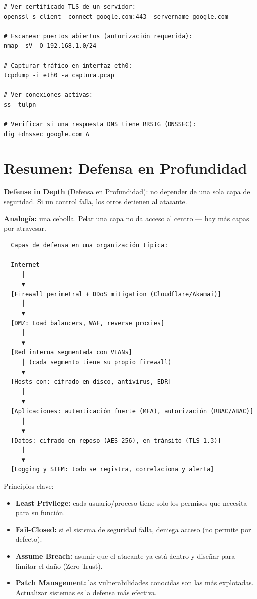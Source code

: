 \begin{codigo}
\begin{lstlisting}
# Ver certificado TLS de un servidor:
openssl s_client -connect google.com:443 -servername google.com

# Escanear puertos abiertos (autorización requerida):
nmap -sV -O 192.168.1.0/24

# Capturar tráfico en interfaz eth0:
tcpdump -i eth0 -w captura.pcap

# Ver conexiones activas:
ss -tulpn

# Verificar si una respuesta DNS tiene RRSIG (DNSSEC):
dig +dnssec google.com A
\end{lstlisting}
\end{codigo}

\section{ Resumen: Defensa en Profundidad}

\begin{concepto}
\textbf{Defense in Depth} (Defensa en Profundidad): no depender de una sola
capa de seguridad. Si un control falla, los otros detienen al atacante.

 \textbf{Analogía:} una cebolla. Pelar una capa no da
acceso al centro --- hay más capas por atravesar.
\end{concepto}

\begin{lstlisting}
  Capas de defensa en una organización típica:

  Internet
     │
     ▼
  [Firewall perimetral + DDoS mitigation (Cloudflare/Akamai)]
     │
     ▼
  [DMZ: Load balancers, WAF, reverse proxies]
     │
     ▼
  [Red interna segmentada con VLANs]
     │ (cada segmento tiene su propio firewall)
     ▼
  [Hosts con: cifrado en disco, antivirus, EDR]
     │
     ▼
  [Aplicaciones: autenticación fuerte (MFA), autorización (RBAC/ABAC)]
     │
     ▼
  [Datos: cifrado en reposo (AES-256), en tránsito (TLS 1.3)]
     │
     ▼
  [Logging y SIEM: todo se registra, correlaciona y alerta]
\end{lstlisting}

Principios clave:
\begin{itemize}
    \item \textbf{Least Privilege:} cada usuario/proceso tiene solo los permisos
          que necesita para su función.
    \item \textbf{Fail-Closed:} si el sistema de seguridad falla, deniega acceso
          (no permite por defecto).
    \item \textbf{Assume Breach:} asumir que el atacante ya está dentro y
          diseñar para limitar el daño (Zero Trust).
    \item \textbf{Patch Management:} las vulnerabilidades conocidas son las más
          explotadas. Actualizar sistemas es la defensa más efectiva.
\end{itemize}
